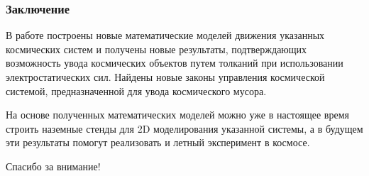 \documentclass[10pt,pdf,hyperref={unicode}]{beamer}
\begin{document}
\begin{frame}
\frametitle{Заключение}
В работе построены новые математические моделей движения указанных космических систем и получены новые результаты, подтверждающих возможность увода космических объектов путем толканий при использовании электростатических сил. Найдены новые законы управления космической системой, предназначенной для увода космического мусора.

На основе полученных математических моделей	 можно уже в настоящее время строить наземные стенды для 2D моделирования указанной системы, а в будущем эти результаты помогут реализовать и летный эксперимент в космосе.
\end{frame}

\begin{frame}
	\begin{center}
		Спасибо за внимание!
	\end{center}
\end{frame}
\end{document}
